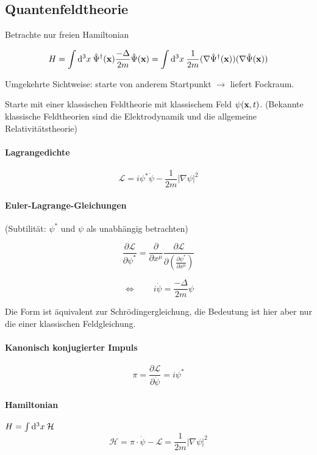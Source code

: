 \documentclass[11pt,a4paper]{report}
\begin{document}
\subsection{Quantenfeldtheorie}

Betrachte nur freien Hamiltonian

$$H = \int\mathrm{d}^3x\:\hat{\Psi}^\dagger (\mathbf{x})\frac{-\Delta}{2m}\hat{\Psi} (\mathbf{x}) = \int\mathrm{d}^3x\:\frac{1}{2m}(\nabla\hat{\Psi}^\dagger (\mathbf{x}))(\nabla\hat{\Psi} (\mathbf{x}))$$

Umgekehrte Sichtweise: starte von anderem Startpunkt $\longrightarrow$ liefert Fockraum.\par 

Starte mit einer klassischen Feldtheorie mit klassischem Feld $\psi (\mathbf{x},t)$. (Bekannte klassische Feldtheorien sind die Elektrodynamik und die allgemeine Relativitätstheorie)

\paragraph{Lagrangedichte}

$$\mathcal{L}=i\psi^*\dot{\psi}-\frac{1}{2m}|\nabla\psi |^2$$

\newcommand{\lag}{\mathcal{L}}

\paragraph{Euler-Lagrange-Gleichungen} (Subtilität: $\psi^*$ und $\psi$ als unabhängig betrachten)

$$\frac{\partial\lag}{\partial\psi^*}=\frac{\partial}{\partial x^\mu}\frac{\partial\lag}{\partial\left(\frac{\partial\psi^*}{\partial x^\mu}\right)}$$

$$\Longleftrightarrow\qquad i\dot{\psi}=\frac{-\Delta}{2m}\psi$$

Die Form ist äquivalent zur Schrödingergleichung, die Bedeutung ist hier aber nur die einer klassischen Feldgleichung.\par 

\paragraph{Kanonisch konjugierter Impuls}
$$\pi = \frac{\partial\lag}{\partial\dot{\psi}}=i\psi^*$$

\paragraph{Hamiltonian} $H=\int\mathrm{d}^3x\:\mathcal{H}$
$$\mathcal{H}=\pi\cdot\dot{\psi}-\lag=\frac{1}{2m}|\nabla\psi |^2$$
\end{document}
